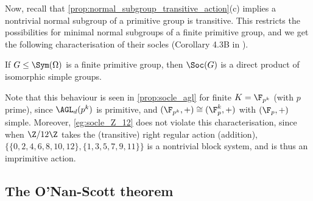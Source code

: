 Now, recall that \autoref{prop:normal_subgroup_transitive_action}(c) implies a nontrivial normal subgroup of a primitive group is transitive. This restricts the possibilities for minimal normal subgroups of a finite primitive group, and we get the following characterisation of their socles (Corollary 4.3B in \cite{dixon_mortimer_perm_groups1996}).

\begin{theorem}\label{thm:socle_is_direct_product}
    If $G \leq \Sym(\Omega)$ is a finite primitive group, then $\Soc(G)$ is a direct product of isomorphic simple groups.
\end{theorem}

Note that this behaviour is seen in \autoref{prop:socle_agl} for finite $K = \F_{p^k}$ (with $p$ prime), since $\AGL_d(p^k)$ is primitive, and $(\F_{p^k},+) \cong (\F_p^k,+)$ with $(\F_p,+)$ simple. Moreover, \autoref{eg:socle_Z_12} does not violate this characterisation, since when $\Z/12\Z$ takes the (transitive) right regular action (addition), $\{\{0,2,4,6,8,10,12\},\{1,3,5,7,9,11\}\}$ is a nontrivial block system, and is thus an imprimitive action.

\subsection{The O'Nan-Scott theorem}

